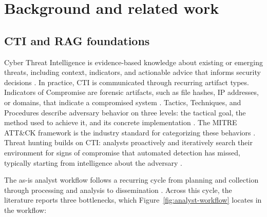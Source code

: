 \clearpage %
\chapter{Background and related work}
\label{ch:background}
\enlargethispage{4\baselineskip}

\section{CTI and RAG foundations}
\label{sec:cti}

Cyber Threat Intelligence is evidence-based knowledge about existing
or emerging threats, including context, indicators, and actionable advice
that informs security decisions \parencite{sun2023ctimining}. In practice,
CTI is communicated through recurring artifact types. Indicators of
Compromise are forensic artifacts, such as file hashes, IP
addresses, or domains, that indicate a compromised system
\parencite{palacin2021threat}. Tactics, Techniques, and Procedures
describe adversary behavior on three levels: the tactical goal, the method
used to achieve it, and its concrete implementation
\parencite{ismail2025wazuh}. The MITRE ATT\&CK framework is the industry
standard for categorizing these behaviors \parencite{lekssays2025techniquerag}.
Threat hunting builds on CTI: analysts proactively and iteratively search
their environment for signs of compromise that automated detection has
missed, typically starting from intelligence about the adversary
\parencite{palacin2021threat,sun2023ctimining}.

The as-is analyst workflow follows a recurring cycle from planning and
collection through processing and analysis to dissemination
\parencite{palacin2021threat}. Across this cycle, the literature reports
three bottlenecks, which Figure~\ref{fig:analyst-workflow} locates in the
workflow:

